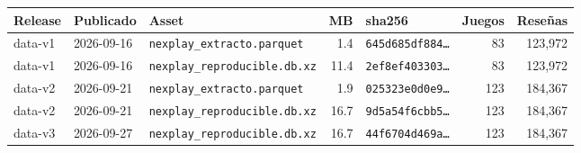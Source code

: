 \begin{tabularx}{\textwidth}{ll>{\raggedright\arraybackslash}Xrlrr}
\toprule
Release & Publicado & Asset & MB & sha256 & Juegos & Reseñas \\
\midrule
data-v1 & 2026-09-16 & \texttt{nexplay\_\allowbreak{}extracto.\allowbreak{}parquet} & 1.4 & \texttt{645d685df884…} & 83 & 123,972 \\
data-v1 & 2026-09-16 & \texttt{nexplay\_\allowbreak{}reproducible.\allowbreak{}db.\allowbreak{}xz} & 11.4 & \texttt{2ef8ef403303…} & 83 & 123,972 \\
data-v2 & 2026-09-21 & \texttt{nexplay\_\allowbreak{}extracto.\allowbreak{}parquet} & 1.9 & \texttt{025323e0d0e9…} & 123 & 184,367 \\
data-v2 & 2026-09-21 & \texttt{nexplay\_\allowbreak{}reproducible.\allowbreak{}db.\allowbreak{}xz} & 16.7 & \texttt{9d5a54f6cbb5…} & 123 & 184,367 \\
data-v3 & 2026-09-27 & \texttt{nexplay\_\allowbreak{}reproducible.\allowbreak{}db.\allowbreak{}xz} & 16.7 & \texttt{44f6704d469a…} & 123 & 184,367 \\
\bottomrule
\end{tabularx}
